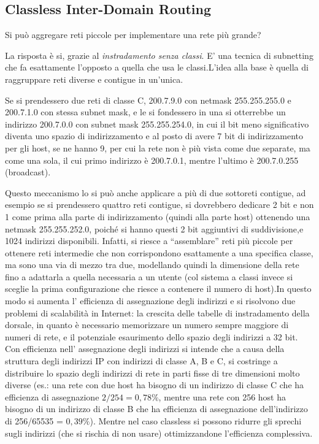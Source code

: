 \subsection{Classless Inter-Domain Routing}
\begin{Question}
  Si può aggregare reti piccole per implementare una rete più grande?
\end{Question}
La risposta è si, grazie al \textit{instradamento senza classi}. E' una tecnica di subnetting che fa esattamente l'opposto a quella che usa le classi.L'idea alla base è quella di raggruppare reti diverse e contigue in un'unica.
\begin{example}
  Se si prendessero due reti di classe C, 200.7.9.0 con netmask 255.255.255.0 e 200.7.1.0 con stessa subnet mask, e le si fondessero in una si otterrebbe un indirizzo 200.7.0.0 con subnet mask 255.255.254.0, in cui il bit meno significativo diventa uno spazio di indirizzamento e al posto di avere 7 bit di indirizzamento per gli host, se ne hanno 9, per cui la rete non è più vista come due separate, ma come una sola, il cui primo indirizzo è 200.7.0.1, mentre l’ultimo è 200.7.0.255 (broadcast).
\end{example}
Questo meccanismo lo si può anche applicare a più di due sottoreti contigue, ad esempio se si prendessero quattro reti contigue, si dovrebbero dedicare 2 bit e non 1 come prima alla parte di indirizzamento (quindi alla parte host) ottenendo una netmask 255.255.252.0, poiché si hanno questi 2 bit aggiuntivi di suddivisione,e 1024 indirizzi disponibili. Infatti, si riesce a “assemblare” reti più piccole per ottenere reti intermedie che non corrispondono esattamente a una specifica classe, ma sono una via di mezzo tra due, modellando quindi la dimensione della rete fino a adattarla a quella necessaria a un utente (col sistema a classi invece si sceglie la prima configurazione che riesce a contenere il numero di host).In questo modo si aumenta l’ efficienza di assegnazione degli indirizzi e si risolvono due problemi di scalabilità in Internet: la crescita delle tabelle di instradamento della dorsale, in quanto è necessario memorizzare un numero sempre maggiore di numeri di rete, e il potenziale esaurimento dello spazio degli indirizzi a 32 bit. Con efficienza nell’ assegnazione degli indirizzi si intende che a causa della struttura degli indirizzi IP con indirizzi di classe A, B e C, si costringe a distribuire lo spazio degli indirizzi di rete in parti fisse di tre dimensioni molto diverse (es.: una rete con due host ha bisogno di un indirizzo di classe C che ha efficienza di assegnazione $2/254 = 0,78\%$, mentre una rete con 256 host ha bisogno di un indirizzo di classe B che ha efficienza di assegnazione dell’indirizzo di 256/65535 = $0,39\%$). Mentre nel caso classless si possono ridurre gli sprechi sugli indirizzi (che si rischia di non usare) ottimizzandone l’efficienza complessiva.
